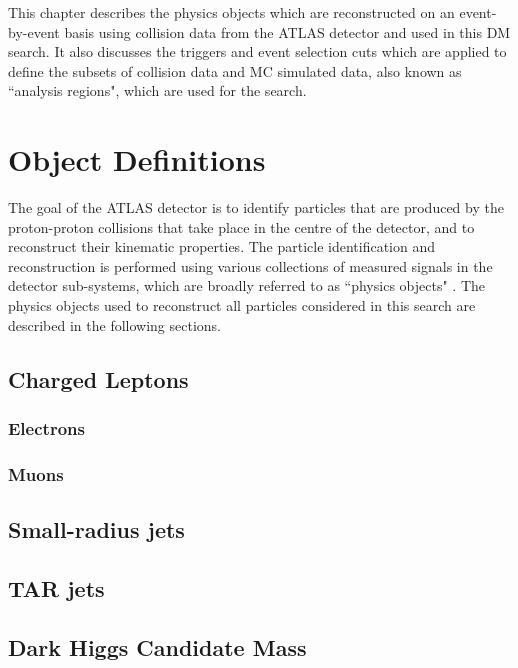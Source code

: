 \label{chapter:objects}

This chapter describes the physics objects which are reconstructed on an event-by-event basis using collision data from the ATLAS detector and used in this DM search. It also discusses the triggers and event selection cuts which are applied to define the subsets of collision data and MC simulated data, also known as ``analysis regions", which are used for the search. 

\section{Object Definitions}
\label{ap:object_defs}

The goal of the ATLAS detector is to identify particles that are produced by the proton-proton collisions that take place in the centre of the detector, and to reconstruct their kinematic properties. The particle identification and reconstruction is performed using various collections of measured signals in the detector sub-systems, which are broadly referred to as ``physics objects" \cite{physics_objects_atlas_2013}. The physics objects used to reconstruct all particles considered in this search are described in the following sections.

\subsection{Charged Leptons}
\subsubsection{Electrons}
\subsubsection{Muons}
\subsection{Small-radius \aktfour jets}
\subsection{TAR jets}
\subsection{\met}
\subsection{Dark Higgs Candidate Mass}

